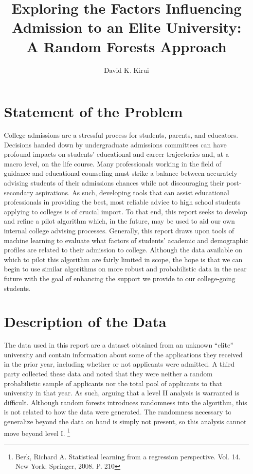 \documentclass[titlepage]{article}   	%
\title{Exploring the Factors Influencing Admission to an Elite University: A Random Forests Approach}
\author{David K. Kirui}
\begin{document}
\maketitle
\section{Statement of the Problem}

College admissions are a stressful process for students, parents, and educators. Decisions handed down by undergraduate admissions committees can have profound impacts on students’ educational and career trajectories and, at a macro level, on the life course. Many professionals working in the field of guidance and educational counseling must strike a balance between accurately advising students of their admissions chances while not discouraging their post-secondary aspirations. As such, developing tools that can assist educational professionals in providing the best, most reliable advice to high school students applying to colleges is of crucial import. To that end, this report seeks to develop and refine a pilot algorithm which, in the future, may be used to aid our own internal college advising processes. Generally, this report draws upon tools of machine learning to evaluate what factors of students’ academic and demographic profiles are related to their admission to college. Although the data available on which to pilot this algorithm are fairly limited in scope, the hope is that we can begin to use similar algorithms on more robust and probabilistic data in the near future with the goal of enhancing the support we provide to our college-going students.

\section{Description of the Data}

The data used in this report are a dataset obtained from an unknown “elite” university and contain information about some of the applications they received in the prior year, including whether or not applicants were admitted. A third party collected these data and noted that they were neither a random probabilistic sample of applicants nor the total pool of applicants to that university in that year. As such, arguing that a level II analysis is warranted is difficult. Although random forests introduces randomness into the algorithm, this is not related to how the data were generated. The randomness necessary to generalize beyond the data on hand is simply not present, so this analysis cannot move beyond level I. \footnote{\label{myfootnote} Berk, Richard A. Statistical learning from a regression perspective. Vol. 14. New York: Springer, 2008. P. 210} 
\end{document}
